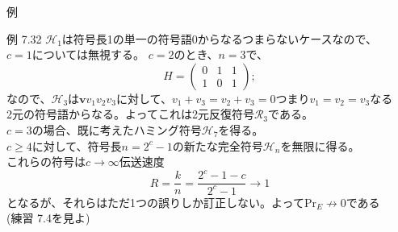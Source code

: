\documentclass[dvipdfmx,10pt,jsarticle]{beamer}
\newcommand{\code}[1]{\mathcal{#1}}
\renewcommand{\vec}[1]{\mathbf{#1}}
\begin{document}
  \begin{frame}{例}
    \begin{block}{例 7.32}
      $\code{H}_1$は符号長1の単一の符号語$0$からなるつまらないケースなので、\\
      $c=1$については無視する。 $c=2$のとき、$n=3$で、
      \[ H = \begin{pmatrix}
          0 & 1 & 1 \\
          1 & 0 & 1
      \end{pmatrix}; \]
      なので、$\code{H}_3$は$\vec{v} v_1 v_2 v_3$に対して、$v_1 + v_3 = v_2 + v_3 = 0$つまり$v_1 = v_2 = v_3$なる \\
      2元の符号語からなる。よってこれは2元反復符号$\code{R}_3$である。\\
      $c = 3$の場合、既に考えたハミング符号$\code{H}_7$を得る。 \\
      $c \geq 4$に対して、符号長$n = 2^c - 1$の新たな完全符号$\code{H}_n$を無限に得る。 \\
      これらの符号は$c \rightarrow \infty$伝送速度
      \[ R = \frac kn = \frac{2^c - 1 - c}{2^c - 1} \rightarrow 1 \]
      となるが、それらはただ1つの誤りしか訂正しない。よって$\text{Pr}_E \not\rightarrow 0$である\\
      (練習 7.4を見よ)
    \end{block}
  \end{frame}
\end{document}
